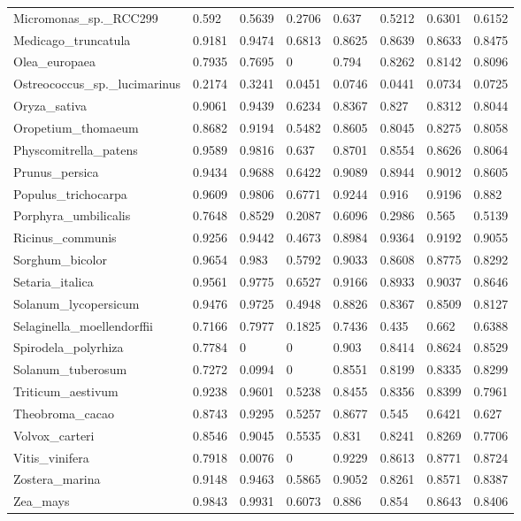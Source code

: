\documentclass{article}
\begin{document}
\begin{table}[!h]
{\begin{tabular}{@{}llllllll@{}}
Micromonas\_sp.\_RCC299 & 0.592 & 0.5639 & 0.2706 & 0.637 & 0.5212 & 0.6301 & 0.6152 \\
Medicago\_truncatula & 0.9181 & 0.9474 & 0.6813 & 0.8625 & 0.8639 & 0.8633 & 0.8475 \\
Olea\_europaea & 0.7935 & 0.7695 & 0 & 0.794 & 0.8262 & 0.8142 & 0.8096 \\
Ostreococcus\_sp.\_lucimarinus & 0.2174 & 0.3241 & 0.0451 & 0.0746 & 0.0441 & 0.0734 & 0.0725 \\
Oryza\_sativa & 0.9061 & 0.9439 & 0.6234 & 0.8367 & 0.827 & 0.8312 & 0.8044 \\
Oropetium\_thomaeum & 0.8682 & 0.9194 & 0.5482 & 0.8605 & 0.8045 & 0.8275 & 0.8058 \\
Physcomitrella\_patens & 0.9589 & 0.9816 & 0.637 & 0.8701 & 0.8554 & 0.8626 & 0.8064 \\
Prunus\_persica & 0.9434 & 0.9688 & 0.6422 & 0.9089 & 0.8944 & 0.9012 & 0.8605 \\
Populus\_trichocarpa & 0.9609 & 0.9806 & 0.6771 & 0.9244 & 0.916 & 0.9196 & 0.882 \\
Porphyra\_umbilicalis & 0.7648 & 0.8529 & 0.2087 & 0.6096 & 0.2986 & 0.565 & 0.5139 \\
Ricinus\_communis & 0.9256 & 0.9442 & 0.4673 & 0.8984 & 0.9364 & 0.9192 & 0.9055 \\
Sorghum\_bicolor & 0.9654 & 0.983 & 0.5792 & 0.9033 & 0.8608 & 0.8775 & 0.8292 \\
Setaria\_italica & 0.9561 & 0.9775 & 0.6527 & 0.9166 & 0.8933 & 0.9037 & 0.8646 \\
Solanum\_lycopersicum & 0.9476 & 0.9725 & 0.4948 & 0.8826 & 0.8367 & 0.8509 & 0.8127 \\
Selaginella\_moellendorffii & 0.7166 & 0.7977 & 0.1825 & 0.7436 & 0.435 & 0.662 & 0.6388 \\
Spirodela\_polyrhiza & 0.7784 & 0 & 0 & 0.903 & 0.8414 & 0.8624 & 0.8529 \\
Solanum\_tuberosum & 0.7272 & 0.0994 & 0 & 0.8551 & 0.8199 & 0.8335 & 0.8299 \\
Triticum\_aestivum & 0.9238 & 0.9601 & 0.5238 & 0.8455 & 0.8356 & 0.8399 & 0.7961 \\
Theobroma\_cacao & 0.8743 & 0.9295 & 0.5257 & 0.8677 & 0.545 & 0.6421 & 0.627 \\
Volvox\_carteri & 0.8546 & 0.9045 & 0.5535 & 0.831 & 0.8241 & 0.8269 & 0.7706 \\
Vitis\_vinifera & 0.7918 & 0.0076 & 0 & 0.9229 & 0.8613 & 0.8771 & 0.8724 \\
Zostera\_marina & 0.9148 & 0.9463 & 0.5865 & 0.9052 & 0.8261 & 0.8571 & 0.8387 \\
Zea\_mays & 0.9843 & 0.9931 & 0.6073 & 0.886 & 0.854 & 0.8643 & 0.8406 \\
\hline
\end{tabular}}
\end{table}
\end{document}

